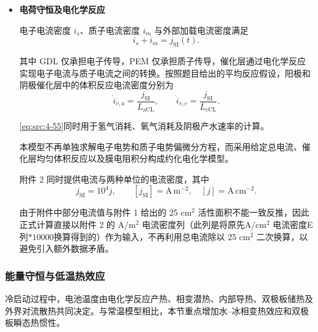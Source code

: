 \documentclass[bwprint]{gmcmthesis}
\numberwithin{equation}{section}
\numberwithin{figure}{section}
\begin{document}
\begin{itemize}
其他区域相应源项均取零。

由\eqref{eq:src:4-44}--\eqref{eq:src:4-50}可知，冰累积首先降低 \(\varepsilon_g\)，继而降低 \(D_{\text{O}_2,\text{eff}}\)，最终使阴极 CL 中氧气浓度下降。这一传质链条构成冰堵引起浓差极化增强的重要物理机制。

\item \textbf {电荷守恒及电化学反应}

电子电流密度 \(i_s\)、质子电流密度 \(i_m\) 与外部加载电流密度满足
\begin{equation}
i_s + i_m = j_{\mathrm{SI}}(t). \label{eq:src:4-54}
\end{equation}

其中 GDL 仅承担电子传导，PEM 仅承担质子传导，催化层通过电化学反应实现电子电流与质子电流之间的转换。按照题目给出的平均反应假设，阳极和阴极催化层中的体积反应电流密度分别为
\begin{equation}
\dot{i}_{v,a} = \frac{j_{\mathrm{SI}}}{L_{\text{aCL}}}, \qquad \dot{i}_{v,c} = \frac{j_{\mathrm{SI}}}{L_{\text{cCL}}}. \label{eq:src:4-55}
\end{equation}

\eqref{eq:src:4-55}同时用于氢气消耗、氧气消耗及阴极产水速率的计算。

本模型不再单独求解电子电势和质子电势偏微分方程，而采用给定总电流、催化层均匀体积反应以及膜电阻积分构成约化电化学模型。

附件 2 同时提供电流与两种单位的电流密度，其中
\[
j_{\mathrm{SI}} = 10^4 j,\qquad [j_{\mathrm{SI}}]=\mathrm{A\,m^{-2}},\quad [j]=\mathrm{A\,cm^{-2}}.
\]

由于附件中部分电流值与附件 1 给出的 25 cm\(^2\) 活性面积不能一致反推，因此正式计算直接以附件 2 的 A/m\(^2\) 电流密度列（此列是将原先A/cm\(^2\) 电流密度E列$*10000$换算得到的）作为输入，不再利用总电流除以 25 cm\(^2\) 二次换算，以避免引入额外数据矛盾。

\end{itemize}


\subsubsection{能量守恒与低温热效应}
冷启动过程中，电池温度由电化学反应产热、相变潜热、内部导热、双极板储热及外界对流散热共同决定。与常温模型相比，本节重点增加水–冰相变热效应和双极板瞬态热惯性。
\end{document}
